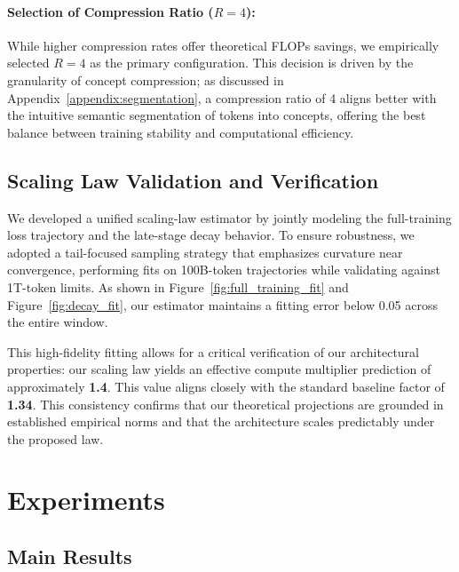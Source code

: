 \paragraph{Selection of Compression Ratio ($R=4$):}
While higher compression rates offer theoretical FLOPs savings, we empirically selected $R=4$ as the primary configuration. This decision is driven by the granularity of concept compression; as discussed in Appendix~\ref{appendix:segmentation}, a compression ratio of 4 aligns better with the intuitive semantic segmentation of tokens into concepts, offering the best balance between training stability and computational efficiency.

\subsection{Scaling Law Validation and Verification}

We developed a unified scaling-law estimator by jointly modeling the full-training loss trajectory and the late-stage decay behavior. To ensure robustness, we adopted a tail-focused sampling strategy that emphasizes curvature near convergence, performing fits on 100B-token trajectories while validating against 1T-token limits. As shown in Figure~\ref{fig:full_training_fit} and Figure~\ref{fig:decay_fit}, our estimator maintains a fitting error below 0.05 across the entire window. 

This high-fidelity fitting allows for a critical verification of our architectural properties: our scaling law yields an effective compute multiplier prediction of approximately \textbf{1.4}. This value aligns closely with the standard baseline factor of \textbf{1.34}. This consistency confirms that our theoretical projections are grounded in established empirical norms and that the architecture scales predictably under the proposed law.


\section{Experiments}

\subsection{Main Results}

